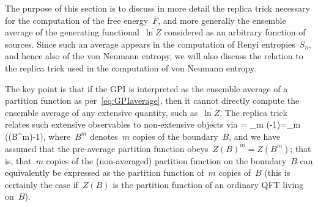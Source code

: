 \documentclass[12pt]{article}
\begin{document}
The purpose of this section is to discuss in more detail the replica trick necessary for the computation of the free energy~$\overline{F}$, and more generally the ensemble average of the generating functional~$\overline{\ln Z}$ considered as an arbitrary function of sources.  Since such an average appears in the computation of Renyi entropies~$S_n$, and hence also of the von Neumann entropy, we will also discuss the relation to the replica trick used in the computation of von Neumann entropy.

The key point is that if the GPI is interpreted as the ensemble average of a partition function as per~\eqref{eq:GPIaverage}, then it cannot directly compute the ensemble average of any extensive quantity, such as~$\overline{\ln Z}$.  The replica trick relates such extensive observables to non-extensive objects via
\be
\label{eq:replicatrick}
 = \lim_{m }  \left(-1\right)=\lim\limits_{m}  (\Pcal(B^{m})-1),
\ee
where~$B^m$ denotes~$m$ copies of the boundary~$B$, and we have assumed that the pre-average partition function obeys~$Z(B)^m = Z(B^m)$; that is, that~$m$ copies of the (non-averaged) partition function on the boundary~$B$ can equivalently be expressed as the partition function of~$m$ copies of~$B$ (this is certainly the case if~$Z(B)$ is the partition function of an ordinary QFT living on~$B$).
\end{document}
